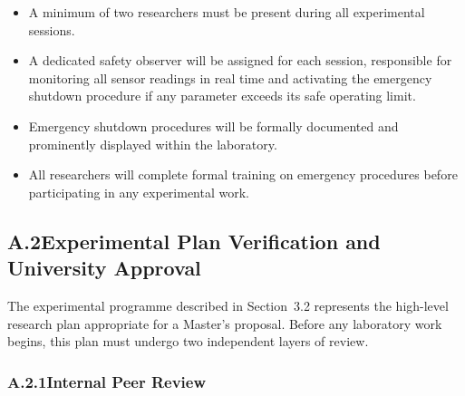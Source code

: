 \documentclass[12pt]{article}
\begin{document}
\begin{itemize}[itemsep=4pt]
    \item A minimum of two researchers must be present during all experimental
          sessions.
    \item A dedicated safety observer will be assigned for each session, responsible
          for monitoring all sensor readings in real time and activating the emergency
          shutdown procedure if any parameter exceeds its safe operating limit.
    \item Emergency shutdown procedures will be formally documented and prominently
          displayed within the laboratory.
    \item All researchers will complete formal training on emergency procedures
          before participating in any experimental work.
\end{itemize}

\subsection*{A.2\quad Experimental Plan Verification and University Approval}

The experimental programme described in Section~3.2 represents the high-level
research plan appropriate for a Master's proposal. Before any laboratory work begins,
this plan must undergo two independent layers of review.

\subsubsection*{A.2.1\quad Internal Peer Review}
\end{document}
